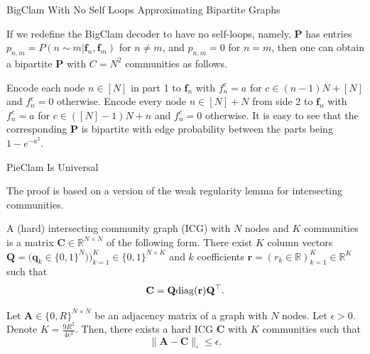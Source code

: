 \documentclass{beamer}
\begin{document}
\begin{frame}{BigClam With No Self Loops Approximating Bipartite Graphs}

If we redefine the BigClam decoder to have no self-loops, namely, $\mathbf{P}$ has entries 
$p_{n,m}=P(n\sim m|\mathbf{f}_n, \mathbf{f}_m)$ for $n\neq m$, and $p_{n,m}=0$ for $n=m$, then one can obtain a bipartite $\mathbf{P}$ with $C=N^2$ communities as follows. 
    
Encode each node $n\in[N]$ in part 1 to $\mathbf{f}_n$ with
$f_n^c=a$ for $c\in (n-1)N + [N]$ and $f_n^c=0$ otherwise. Encode every node $n\in [N]+N$ from side 2 to $\mathbf{f}_n$ with
$f_n^c=a$ for $c\in ([N]-1)N+n$ and $f_n^c=0$ otherwise. It is easy to see that the corresponding $\mathbf{P}$ is bipartite with edge probability between the parts being $1-e^{-a^2}$.
\end{frame}






\begin{frame}{PieClam Is Universal}
    
The proof is based on a version of the weak regularity lemma for intersecting communities. 

\begin{definition}
    A (hard) intersecting community graph (ICG) with $N$ nodes and  $K$ communities is a matrix $\mathbf{C}\in\mathbb{R}^{N\times N}$ of the following form. There exist $K$ column vectors $\mathbf{Q}=\big(\mathbf{q}_k\in\{0,1\}^N\big))_{k=1}^K\in \{0,1\}^{N\times K}$ and $k$ coefficients $\mathbf{r}=(r_k\in\mathbb{R})_{k=1}^K\in\mathbb{R}^K$ such that
    \[\mathbf{C}= \mathbf{Q}{\rm diag}(\mathbf{r})\mathbf{Q}^{\top }.\]
\end{definition}

\begin{theorem}
     Let $\mathbf{A}\in\{0,R\}^{N\times N}$ be an adjacency matrix of a graph with $N$ nodes. Let $\epsilon>0$. Denote $K=\frac{9R^2}{4\epsilon^2}$. Then, there exists a hard ICG $\mathbf{C}$ with $K$ communities such that 
    \begin{equation}
    \|\mathbf{A}-\mathbf{C}\|_{\square} \leq \epsilon.
    \end{equation}
\end{theorem}

\end{frame}
\end{document}
